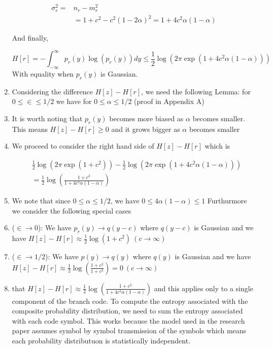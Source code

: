 \documentclass[fontsize=12pt]{article}
\theoremstyle{definition}
\begin{document}
\begin{enumerate}
\begin{equation*}
\begin{aligned}
\sigma_r^2 = &n_r-m_r^2 \\
&= 1+c^2 - c^2(1-2\alpha)^2 = 1+4c^2\alpha(1-\alpha)
\end{aligned}
\end{equation*}

And finally, 

\begin{equation}
H[r] = -\int_{-\infty}^{\infty} p_r(y)\log(p_r(y)) dy \leq \frac{1}{2} \log(2\pi \exp(1+4c^2\alpha(1-\alpha)))
\end{equation}
With equality when $p_r(y) $ is Gaussian.

\item Considering the difference $H[z] - H[r]$, we need the following Lemma: 
for $0\leq \in \leq 1/2$ we have for $0\leq \alpha\leq 1/2$ (proof in Appendix A)

\item It is worth noting that $p_r(y)$ becomes more biased as $\alpha$ becomes smaller. This means $H[z]-H[r] \geq 0$ and it grows bigger as $\alpha$ becomes smaller

\item We proceed to consider the right hand side of  $H[z]-H[r]$ which is  

\begin{equation}
\begin{aligned}
&\frac{1}{2} \log(2\pi \exp(1+c^2))-
\frac{1}{2} \log(2\pi \exp(1+4c^2\alpha(1-\alpha)))\\
&=\frac{1}{2} \log\left(\frac{1+c^2}{1+4c^2\alpha(1-\alpha)}\right)
\end{aligned}
\end{equation}

\item We note that since $0\leq \alpha\leq 1/2$, we have $0\leq 4\alpha(1-\alpha) \leq 1$ Furthurmore we consider the following special cases 

\item ($\in \rightarrow 0$): We have $p_r(y) \rightarrow q(y-c)$ where $q(y-c)$ is Gaussian and we have $H[z]-H[r] \approx \frac{1}{2} \log(1+c^2)~(c \rightarrow \infty)$

\item ($\in \rightarrow 1/2$):  We have $p(y) \rightarrow q(y)$ where $q(y)$ is Gaussian and we have $H[z]-H[r] \approx \frac{1}{2} \log(\frac{1+c^2}{1+c^2}) = 0 ~(c \rightarrow \infty)$

\item that $H[z]-H[r] \approx \frac{1}{2} \log\left(\frac{1+c^2}{1+4c^2\alpha(1-\alpha)}\right)$ and this applies only to a single component of the branch code. To compute the entropy associated with the composite probability distribution, we need to sum the entropy associated with each code symbol. This works because the model used in the research paper assumes symbol by symbol transmission of the symbols which means each probability distributuon is statistically independent.

\end{enumerate}
\end{document}
